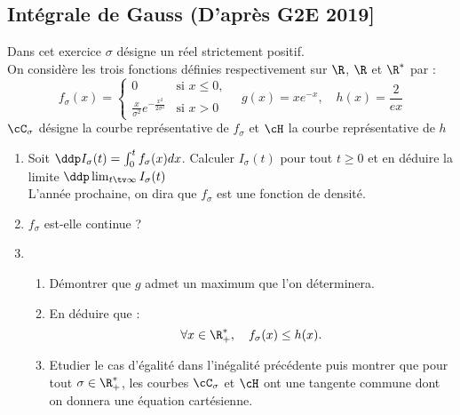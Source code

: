 \subsection{Intégrale de Gauss (D'après G2E 2019]}

\begin{exercice}[G2E 2019]
Dans cet exercice $\sigma$ désigne un réel strictement positif. \\

On considère les trois fonctions définies respectivement sur $\R$, $\R$ et $\R^*$ par :
$$
f_\sigma (x) = \left\{\begin{array}{lr}
0 & \text{si $x\leq 0,$}\\
\frac{x}{\sigma^2}e^{-\frac{x^2}{2\sigma^2}} &\text{si $x> 0$}
\end{array}\right. \quad g(x) =xe^{-x}, \quad h(x) = \frac{2}{ex}
$$
$\cC_\sigma$ désigne la courbe représentative de $f_\sigma$ et $\cH$ la courbe représentative de $h$
\begin{enumerate}
\item Soit $\ddp I_\sigma(t) = \int_0^t f_\sigma(x) dx$. Calculer $I_\sigma(t) $ pour tout $t\geq 0$ et en déduire la limite $\ddp \lim_{t\tv \infty} I_\sigma(t) $ \\
{\footnotesize L'année prochaine, on dira que $f_\sigma$ est une fonction de densité.}
\item $f_\sigma$ est-elle continue ? 
\item \begin{enumerate}
\item Démontrer que $g$ admet un maximum que l'on déterminera. 
\item En déduire que :
$$\forall x\in \R_+^*, \quad f_\sigma (x) \leq h(x).$$
\item Etudier le cas d'égalité dans l'inégalité précédente puis montrer que pour tout $\sigma \in \R^*_+$, les courbes $\cC_\sigma$ et $\cH$ ont une tangente commune dont on donnera une équation cartésienne. 
\end{enumerate}
\end{enumerate}

\end{exercice}

